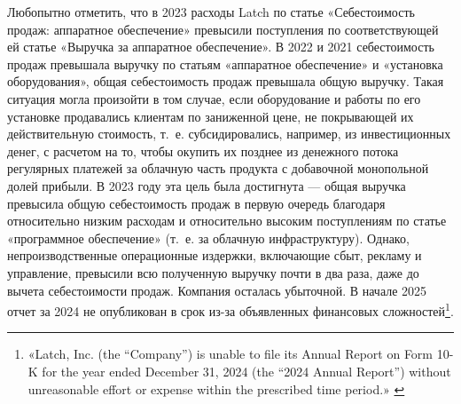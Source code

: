 \documentclass{article}
\begin{document}
Любопытно отметить, что в 2023 расходы Latch по статье «Себестоимость продаж: аппаратное обеспечение» превысили поступления по соответствующей ей статье «Выручка за аппаратное обеспечение». В 2022 и 2021 себестоимость продаж превышала выручку по статьям «аппаратное обеспечение» и «установка оборудования», общая себестоимость продаж превышала общую выручку. Такая ситуация могла произойти в том случае, если оборудование и работы по его установке продавались клиентам по заниженной цене, не покрывающей их действительную стоимость, т.~е. субсидировались, например, из инвестиционных денег, с расчетом на то, чтобы окупить их позднее из денежного потока регулярных платежей за облачную часть продукта с добавочной монопольной долей прибыли. В 2023 году эта цель была достигнута — общая выручка превысила общую себестоимость продаж в первую очередь благодаря относительно низким расходам и относительно высоким поступлениям по статье «программное обеспечение» (т.~е. за облачную инфраструктуру). Однако, непроизводственные операционные издержки, включающие сбыт, рекламу и управление, превысили всю полученную выручку почти в два раза, даже до вычета себестоимости продаж. Компания осталась убыточной. В начале 2025 отчет за 2024 не опубликован в срок из-за объявленных финансовых сложностей\footnote{«Latch, Inc. (the “Company”) is unable to file its Annual Report on Form 10-K for the year ended December 31, 2024 (the “2024 Annual Report”) without unreasonable effort or expense within the prescribed time period.» \cite{latch10KFail2024}}.
\end{document}
